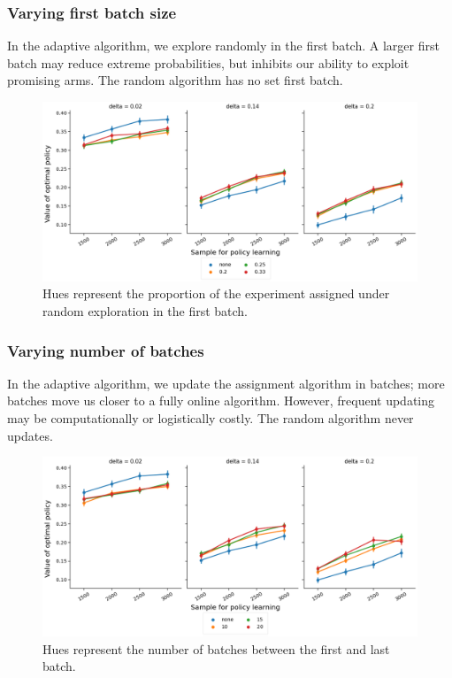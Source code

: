 \documentclass[letterpaper, 12pt, parskip=full,DIV=10]{scrartcl}
\begin{document}
\subsubsection{Varying first batch size}
In the adaptive algorithm, we explore randomly in the first batch. A larger first batch may reduce extreme probabilities, but inhibits our ability to exploit promising arms. The random algorithm has no set first batch. 

\begin{figure}[H]
\centering
\includegraphics[width=\textwidth]{figures/value_diff_control_initial_batch_prop.png}
\caption{
Hues represent the proportion of the experiment assigned under random exploration in the first batch. }
\label{fig:value_control_initial_batch_prop}
\end{figure}

\subsubsection{Varying number of batches}
In the adaptive algorithm, we update the assignment algorithm in batches; more batches move us closer to a fully online algorithm. However, frequent updating may be computationally or logistically costly. The random algorithm never updates. 

\begin{figure}[H]
\centering
\includegraphics[width=\textwidth]{figures/value_diff_control_num_batches.png}
\caption{
Hues represent the number of batches between the first and last batch.}
\label{fig:value_control_batches}
\end{figure}
\end{document}
